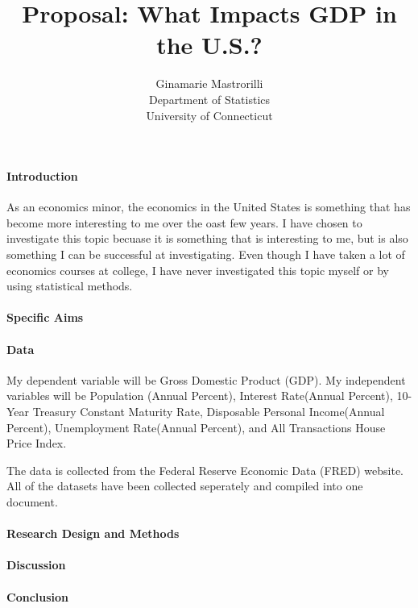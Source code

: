 \documentclass[12pt]{article}
\title{Proposal: What Impacts GDP in the U.S.? }
\author{Ginamarie Mastrorilli\\
  Department of Statistics\\
  University of Connecticut
}
\begin{document}
\maketitle


\paragraph{Introduction}
As an economics minor, the economics in the United States is something that has become more interesting to me over the oast few years. I have chosen to investigate this topic becuase it is something that is interesting to me, but is also something I can be successful at investigating. Even though I have taken a lot of economics courses at college, I have never investigated this topic myself or by using statistical methods.

\paragraph{Specific Aims}
\lipsum[2]

\paragraph{Data}
My dependent variable will be Gross Domestic Product (GDP).
My independent variables will be Population (Annual Percent), Interest Rate(Annual Percent), 10-Year Treasury Constant Maturity Rate, Disposable Personal Income(Annual Percent), Unemployment Rate(Annual Percent), and All Transactions House Price Index. 

The data is collected from the Federal Reserve Economic Data (FRED) website. All of the datasets have been collected seperately and compiled into one document. 

\paragraph{Research Design and Methods}
\lipsum[4]

\paragraph{Discussion}
\lipsum[5] \citep{wild2004global}

\paragraph{Conclusion}
\lipsum[1]




\end{document}
